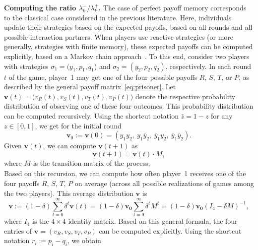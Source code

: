 \documentclass[11pt]{article}
\def\strategy{\texttt{$\sigma$}}
\theoremstyle{plainCl1}
\theoremstyle{plainCl2}
\begin{document}
{\bf Computing the ratio $\lambda^-_k/\lambda^+_k$.}
The case of perfect payoff memory corresponds to the classical case considered in the previous literature. 
Here, individuals update their strategies based on the expected payoffs, based on all rounds and all possible interaction partners. 
When players use reactive strategies (or more generally, strategies with finite memory), these expected payoffs can be computed explicitly, based on a Markov chain approach~\cite{sigmund2010calculus}. 
To this end, consider two players with strategies $\strategy_1\!=\!(y_1, p_1, q_1$) and $\strategy_2\!=\!(y_2,p_2,q_2)$, respectively. 
In each round $t$ of the game, player~1 may get one of the four possible payoffs $R$, $S$, $T$, or $P$, as described by the general payoff matrix~\eqref{eq:prisoner}. 
Let $\mathbf{v}(t)\!=\!\big(v_R(t),v_S(t),v_T(t),v_P(t)\big)$ denote the respective probability distribution of observing one of these four outcomes.  
This probability distribution can be computed recursively. 
Using the shortcut notation $\bar{z}\!=\!1\!-\!z$ for any $z\!\in\![0,1]$, we get for the initial round 
\begin{equation}
\mathbf{v}_0:=\mathbf{v}(0) = (y_1 y_2,~y_1 \bar{y}_2,~\bar{y}_1 y_2,~\bar{y}_1 \bar{y}_2).
\end{equation}
Given $\mathbf{v}(t)$, we can compute $\mathbf{v}(t\!+\!1)$ as  
\begin{equation}
\mathbf{v}(t\!+\!1) = \mathbf{v}(t)\cdot M,
\end{equation}
where $M$ is the transition matrix of the process, 
\begin{equation}\label{eq:transition_matrix}
  .
\end{equation}
Based on this recursion, we can compute how often player~1 receives one of the four payoffs $R$, $S$, $T$, $P$ on average (across all possible realizations of games among the two players). This average distribution $\mathbf{v}$ is
\begin{equation}
\mathbf{v} := (1\!-\!\delta) \sum_{t=0}^\infty \delta^t \mathbf{v}(t) 
= (1\!-\!\delta) \mathbf{v_0} \sum_{t=0}^\infty \delta^t M^t
= (1\!-\!\delta) \mathbf{v_0} (I_4-\delta M)^{-1},
\end{equation}
where $I_4$ is the $4\times4$ identity matrix. 
Based on this general formula, the four entries of $\mathbf{v}=(v_R, v_S, v_T, v_P)$ can be computed explicitly. 
Using the shortcut notation $r_i:=p_i\!-\!q_i$, we obtain
\end{document}
